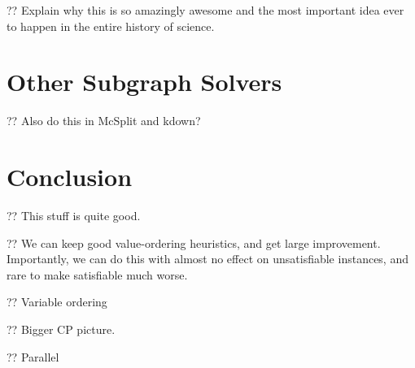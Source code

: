 \documentclass{article}
\begin{document}
?? Explain why this is so amazingly awesome and the most important idea ever to happen in the entire
history of science.

\section{Other Subgraph Solvers}

?? Also do this in McSplit and kdown?

\section{Conclusion}

?? This stuff is quite good.

?? We can keep good value-ordering heuristics, and get large improvement. Importantly, we can do
this with almost no effect on unsatisfiable instances, and rare to make satisfiable much worse.

?? Variable ordering

?? Bigger CP picture.

?? Parallel



\end{document}
